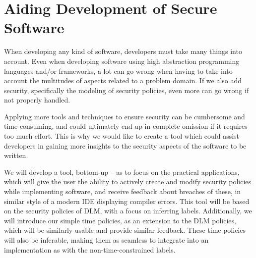 
\section{Aiding Development of Secure Software}
When developing any kind of software, developers must take many things into account.
Even when developing software using high abstraction programming languages and/or frameworks, a lot can go wrong when having to take into account the multitudes of aspects related to a problem domain.
If we also add security, specifically the modeling of security policies, even more can go wrong if not properly handled.

Applying more tools and techniques to ensure security can be cumbersome and time-consuming, and could ultimately end up in complete omission if it requires too much effort.
This is why we would like to create a tool which could assist developers in gaining more insights to the security aspects of the software to be written.

We will develop a tool, bottom-up -- as to focus on the practical applications, which will give the user the ability to actively create and modify security policies while implementing software, and receive feedback about breaches of these, in similar style of a modern IDE displaying compiler errors.
This tool will be based on the security policies of DLM, with a focus on inferring labels.
Additionally, we will introduce our simple time policies, as an extension to the DLM policies, which will be similarly usable and provide similar feedback.
These time policies will also be inferable, making them as seamless to integrate into an implementation as with the non-time-constrained labels.

